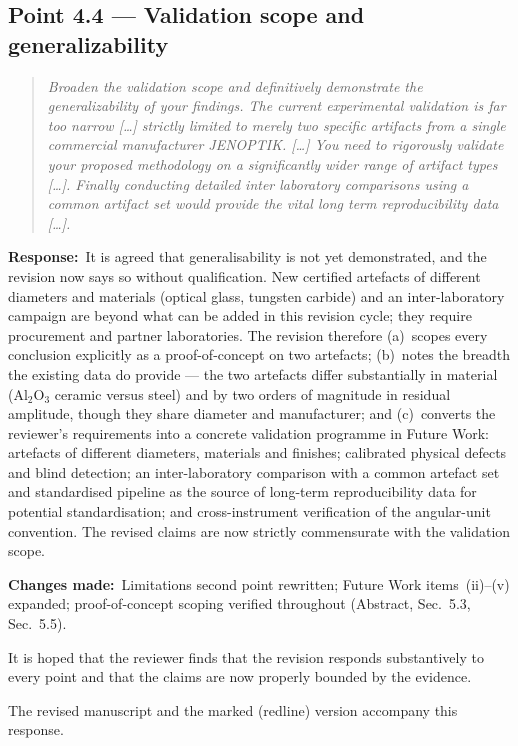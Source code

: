 \documentclass[11pt,a4paper]{article}
\newenvironment{reviewercomment}%
{\par\medskip\noindent\begin{quotation}\itshape\color{black!70}}%
{\end{quotation}\medskip}
\newcommand{\response}{\par\noindent\textbf{Response:}\ }
\newcommand{\changes}{\par\noindent\textbf{Changes made:}\ }
\begin{document}
\subsection*{Point 4.4 --- Validation scope and generalizability}
\begin{reviewercomment}
Broaden the validation scope and definitively demonstrate the generalizability of your findings. The current experimental validation is far too narrow [\ldots] strictly limited to merely two specific artifacts from a single commercial manufacturer JENOPTIK. [\ldots] You need to rigorously validate your proposed methodology on a significantly wider range of artifact types [\ldots]. Finally conducting detailed inter laboratory comparisons using a common artifact set would provide the vital long term reproducibility data [\ldots].
\end{reviewercomment}
\response It is agreed that generalisability is not yet demonstrated, and the revision now says so without qualification. New certified artefacts of different diameters and materials (optical glass, tungsten carbide) and an inter-laboratory campaign are beyond what can be added in this revision cycle; they require procurement and partner laboratories. The revision therefore (a)~scopes every conclusion explicitly as a proof-of-concept on two artefacts; (b)~notes the breadth the existing data do provide --- the two artefacts differ substantially in material (Al$_2$O$_3$ ceramic versus steel) and by two orders of magnitude in residual amplitude, though they share diameter and manufacturer; and (c)~converts the reviewer's requirements into a concrete validation programme in Future Work: artefacts of different diameters, materials and finishes; calibrated physical defects and blind detection; an inter-laboratory comparison with a common artefact set and standardised pipeline as the source of long-term reproducibility data for potential standardisation; and cross-instrument verification of the angular-unit convention. The revised claims are now strictly commensurate with the validation scope.
\changes Limitations second point rewritten; Future Work items~(ii)--(v) expanded; proof-of-concept scoping verified throughout (Abstract, Sec.~5.3, Sec.~5.5).

\bigskip
It is hoped that the reviewer finds that the revision responds substantively to every point and that the claims are now properly bounded by the evidence.

\bigskip
The revised manuscript and the marked (redline) version accompany this response.
\end{document}
